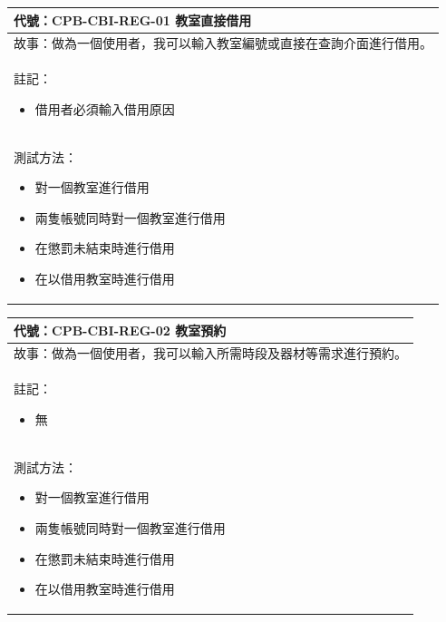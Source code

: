 \documentclass{article}
\begin{document}
\begin{table}[H]
	\begin{tabular}{| m{13cm} |}
		\hline
		代號：CPB-CBI-REG-01	教室直接借用          \\ \hline
		故事：做為一個使用者，我可以輸入教室編號或直接在查詢介面進行借用。 \\	\hline
		註記：
		\begin{itemize}
			\item 借用者必須輸入借用原因
		\end{itemize}                  \\ \hline
		測試方法：
		\begin{itemize}
			\item 對一個教室進行借用
			\item 兩隻帳號同時對一個教室進行借用
			\item 在懲罰未結束時進行借用
			\item 在以借用教室時進行借用
		\end{itemize}
		\\	\hline
	\end{tabular}
\end{table}

\begin{table}[H]
	\begin{tabular}{| m{13cm} |}
		\hline
		代號：CPB-CBI-REG-02	教室預約          \\ \hline
		故事：做為一個使用者，我可以輸入所需時段及器材等需求進行預約。 \\	\hline
		註記：
		\begin{itemize}
			\item 無
		\end{itemize}                  \\ \hline
		測試方法：
		\begin{itemize}
			\item 對一個教室進行借用
			\item 兩隻帳號同時對一個教室進行借用
			\item 在懲罰未結束時進行借用
			\item 在以借用教室時進行借用
		\end{itemize}
		\\	\hline
	\end{tabular}
\end{table}
\end{document}
